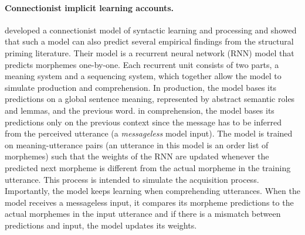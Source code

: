 

















\paragraph{Connectionist implicit learning accounts.} \cite{Cheng2006} developed a connectionist model of syntactic learning and processing and showed
that such a model can also predict several empirical findings from the structural priming literature. Their model is a recurrent neural network (RNN)
model \cite{Elman1990} that predicts morphemes one-by-one. Each recurrent unit consists of two parts, a meaning system and a sequencing system, 
which together allow the model to simulate production and comprehension. In production, the model bases
its predictions on a global sentence meaning, represented by abstract semantic roles and lemmas, and the previous word. in comprehension, the model 
bases its predictions only on the previous context since the message has to be inferred from the perceived utterance (a \textit{messageless} model input). 
The model is trained on meaning-utterance pairs (an utterance in this model is an order list of morphemes) such that the weights of the RNN are updated 
whenever the predicted next morpheme is different from the actual morpheme in the training utterance. This process is intended to simulate the acquisition process.
Importantly, the model keeps learning when comprehending utterances. When the model receives a messageless input, it compares its morpheme predictions
to the actual morphemes in the input utterance and if there is a mismatch between predictions and input, the model updates its weights.


